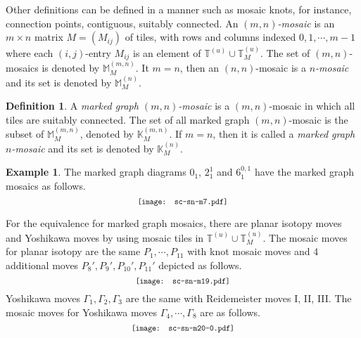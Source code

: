 \documentclass{article}
\theoremstyle{definition}
\newtheorem{example}{Example}
\newtheorem{definition}{Definition}
\begin{document}
Other definitions can be defined in a manner such as mosaic knots, for instance, connection points, contiguous, suitably connected. 
An \textit{$(m, n)$-mosaic} is an $m\times n$ matrix $M=(M_{ij})$ of tiles, with rows and columns indexed $0, 1, \cdots, m-1$ where each $(i,j)$-entry $M_{ij}$ is an element of $\mathbb{T}^{(u)}\cup \mathbb{T}^{(u)}_{M}$. The set of $(m, n)$-mosaics is denoted by $\mathbb{M}_{M}^{(m, n)}$. 
It $m=n$, then an $(n, n)$-mosaic is a \textit{$n$-mosaic} and its set is denoted by $\mathbb{M}_{M}^{(n)}$.

\begin{definition}
 A \textit{marked graph $(m, n)$-mosaic} is a $(m, n)$-mosaic in which all tiles are suitably connected. The set of all marked graph $(m, n)$-mosaic is the subset of $\mathbb{M}^{(m, n)}_{M}$, denoted by $\mathbb{K}^{(m, n)}_{M}$. 
If $m=n$, then it is called a \textit{marked graph $n$-mosaic} and its set is denoted by $\mathbb{K}^{(n)}_{M}$.
\end{definition}

\begin{example}
The marked graph diagrams $0_1$, $2_{1}^{1}$ and $6_{1}^{0,1}$ have the marked graph mosaics as follows. 
\[\scalebox{0.8}{\texttt{[image: sc-sn-m7.pdf]}}\]
\end{example}

For the equivalence for marked graph mosaics, there are planar isotopy moves and Yoshikawa moves by using mosaic tiles in $\mathbb{T}^{(u)}\cup \mathbb{T}^{(u)}_{M}$. 
The mosaic moves for planar isotopy are the same $P_{1}, \cdots, P_{11}$ with knot mosaic moves and 4 additional moves $P_{8}', P_{9}', P_{10}', P_{11}'$ depicted as follows. 
\[\scalebox{0.8}{\texttt{[image: sc-sn-m19.pdf]}}\]
Yoshikawa moves $\Gamma_{1}, \Gamma_{2}, \Gamma_{3}$ are the same with Reidemeister moves I, II, III.
The mosaic moves for Yoshikawa moves $\Gamma_{4}, \cdots, \Gamma_{8}$ are as follows. %
\[\scalebox{0.8}{\texttt{[image: sc-sn-m20-0.pdf]}}\]

\end{document}
